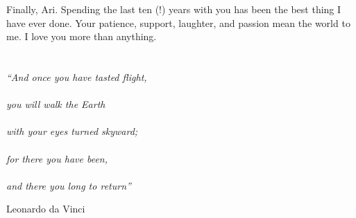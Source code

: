 Finally, Ari. 
Spending the last ten (!) years with you has been the best thing I have ever done.
Your patience, support, laughter, and passion mean the world to me. 
I love you more than anything.


\tableofcontents
\listoffigures
\listoftables


\chapter*{}
\epigraph{
  \textit{``And once you have tasted flight, \\ \\
            you will walk the Earth \\ \\
            with your eyes turned skyward; \\ \\
            for there you have been, \\ \\
            and there you long to return''}}
         {Leonardo da Vinci}


\cleardoublepage
